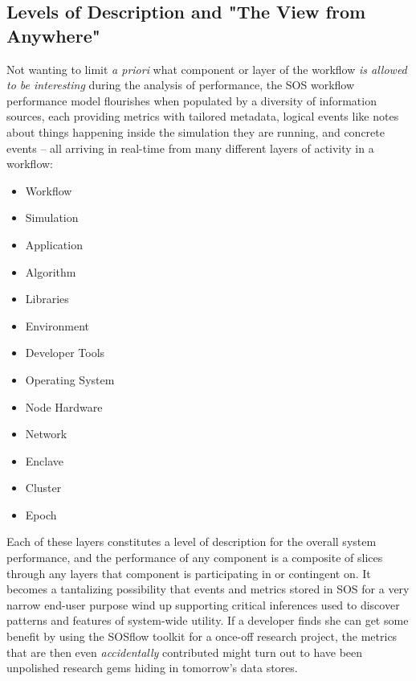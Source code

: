 \subsection{Levels of Description and "The View from Anywhere"}
Not wanting to limit \textit{a priori} what component or layer of the
workflow \textit{is allowed to be interesting} during the analysis of
performance, the SOS workflow performance model flourishes when
populated by a diversity of information sources, each providing
metrics with tailored metadata, logical events like notes about things
happening inside the simulation they are running, and concrete events
-- all arriving in real-time from many different layers of activity in
a workflow:
%
\begin{itemize}
    \item Workflow
    \item Simulation
    \item Application
    \item Algorithm
    \item Libraries
    \item Environment
    \item Developer Tools
    \item Operating System
    \item Node Hardware
    \item Network
    \item Enclave
    \item Cluster
    \item Epoch
\end{itemize}

Each of these layers constitutes a level of description for the
overall system performance, and the performance of any component is a
composite of slices through any layers that component is participating
in or contingent on.
%
It becomes a tantalizing possibility that events and metrics stored in
SOS for a very narrow end-user purpose wind up supporting critical
inferences used to discover patterns and features of system-wide
utility.
%
If a developer finds she can get some benefit by using the SOSflow
toolkit for a once-off research project, the metrics that are then
even \textit{accidentally} contributed might turn out to have been
unpolished research gems hiding in tomorrow's data stores.

